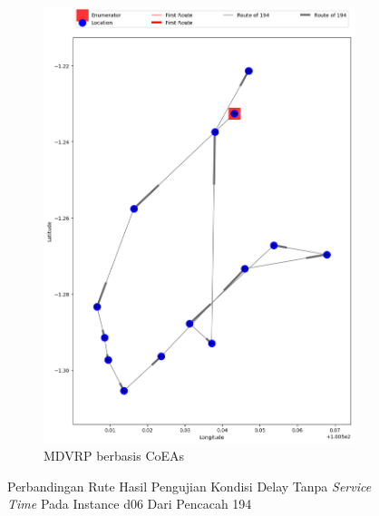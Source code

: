 \begin{figure}[H]
	\centering
	\begin{subfigure}[t]{\textwidth}
		\centering
		\includegraphics[width=\textwidth]{Resources/Images/delayed_6/real_m15_n100_delayed_6_194_coes}
		\caption{MDVRP berbasis CoEAs}
		\label{fig:real_m15_n100_delayed_6_194_coes}
	\end{subfigure}
	\caption{Perbandingan Rute Hasil Pengujian Kondisi Delay Tanpa \textit{Service Time} Pada Instance d06 Dari Pencacah 194}
	\label{fig:real_m15_n100_delayed_6_194}
\end{figure}


